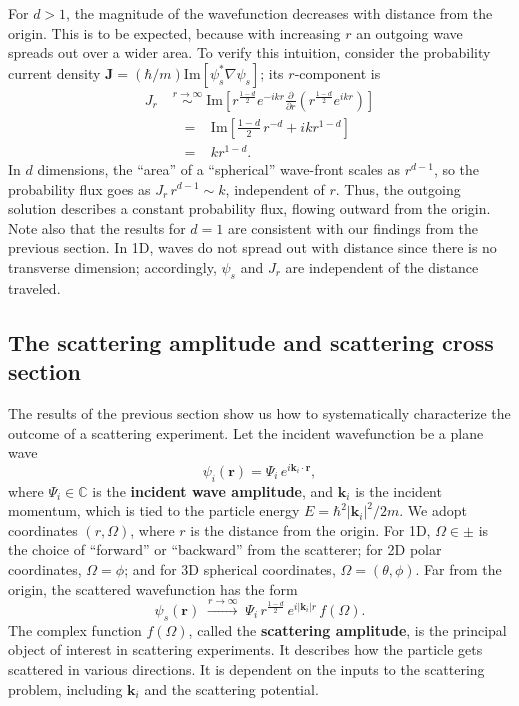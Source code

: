 \documentclass[pra,11pt]{revtex4}
\begin{document}
For $d > 1$, the magnitude of the wavefunction decreases with distance
from the origin.  This is to be expected, because with increasing $r$
an outgoing wave spreads out over a wider area.  To verify this
intuition, consider the probability current density
$\mathbf{J} = (\hbar/m) \mathrm{Im}\left[\psi_s^*\nabla\psi_s\right]$;
its $r$-component is
$$\begin{aligned}J_r \; &\overset{r\rightarrow\infty}{\sim} \; \mathrm{Im}\left[r^{\frac{1-d}{2}} e^{-ikr} \frac{\partial}{\partial r}\left(r^{\frac{1-d}{2}} e^{ikr}\right)\right] \\ &\;\;=\;\;\;\mathrm{Im}\left[\frac{1-d}{2}\, r^{-d} + ik r^{1-d}\right]\\ &\;\;=\;\;\; kr^{1-d}.\end{aligned}$$
In $d$ dimensions, the ``area'' of a ``spherical'' wave-front scales
as $r^{d-1}$, so the probability flux goes as $J_r \,r^{d-1} \sim k$,
independent of $r$.  Thus, the outgoing solution describes a constant
probability flux, flowing outward from the origin.  Note also that the
results for $d=1$ are consistent with our findings from the previous
section.  In 1D, waves do not spread out with distance since there is
no transverse dimension; accordingly, $\psi_s$ and $J_r$ are
independent of the distance traveled.

\subsection{The scattering amplitude and scattering cross section}

The results of the previous section show us how to systematically
characterize the outcome of a scattering experiment.  Let the incident
wavefunction be a plane wave
$$\psi_i(\mathbf{r}) = \Psi_i \, e^{i\mathbf{k}_i\cdot\mathbf{r}},$$
where $\Psi_i \in \mathbb{C}$ is the \textbf{incident wave amplitude},
and $\mathbf{k}_i$ is the incident momentum, which is tied to the
particle energy $E = \hbar^2|\mathbf{k}_i|^2/2m$.  We adopt
coordinates $(r,\Omega)$, where $r$ is the distance from the origin.
For 1D, $\Omega \in \pm$ is the choice of ``forward'' or ``backward''
from the scatterer; for 2D polar coordinates, $\Omega = \phi$; and for
3D spherical coordinates, $\Omega = (\theta,\phi)$.  Far from the
origin, the scattered wavefunction has the form
$$\psi_s(\mathbf{r})\;  \overset{r\rightarrow\infty}{\longrightarrow}\; \Psi_i \, r^{\frac{1-d}{2}} \, e^{i|\mathbf{k}_i|r} \, f(\Omega).$$
The complex function $f(\Omega)$, called the \textbf{scattering
  amplitude}, is the principal object of interest in scattering
experiments.  It describes how the particle gets scattered in various
directions.  It is dependent on the inputs to the scattering problem,
including $\mathbf{k}_i$ and the scattering potential.
\end{document}
